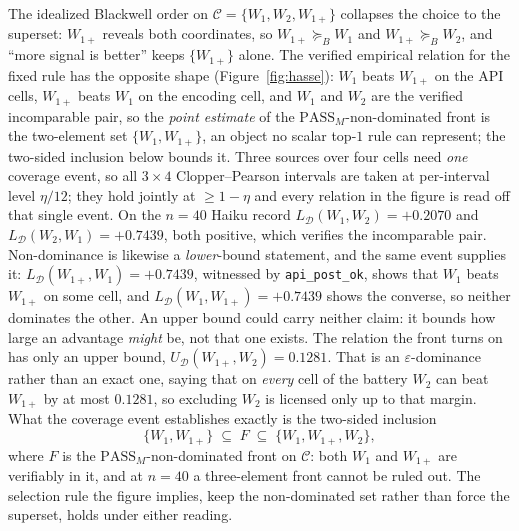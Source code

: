 \documentclass[11pt]{article}
\theoremstyle{plain}
\theoremstyle{definition}
\theoremstyle{remark}
\newcommand{\PASS}{\mathrm{PASS}}
\newcommand{\Dcal}{\mathcal{D}}
\newcommand{\Bord}{\succeq_{B}}
\begin{document}
The idealized Blackwell order on $\mathcal{C}=\{W_1,W_2,W_{1+}\}$ collapses the choice to the
superset: $W_{1+}$ reveals both coordinates, so $W_{1+}\Bord W_1$ and $W_{1+}\Bord W_2$, and
``more signal is better'' keeps $\{W_{1+}\}$ alone. The verified empirical relation for the fixed
rule has the opposite shape (Figure~\ref{fig:hasse}): $W_1$ beats $W_{1+}$ on the API cells,
$W_{1+}$ beats $W_1$ on the encoding cell, and $W_1$ and $W_2$ are the verified incomparable pair,
so the \emph{point estimate} of the $\PASS_M$-non-dominated front is the two-element set
$\{W_1, W_{1+}\}$, an object no scalar top-$1$ rule can represent; the two-sided
inclusion below bounds it. Three sources over four cells need
\emph{one} coverage event, so all
$3\times 4$ Clopper--Pearson intervals are taken at per-interval level $\eta/12$; they hold jointly
at $\ge 1-\eta$ and every relation in the figure is read off that single event. On the $n{=}40$
Haiku record $L_{\Dcal}(W_1,W_2)=+0.2070$ and $L_{\Dcal}(W_2,W_1)=+0.7439$, both positive,
which verifies the incomparable pair.
Non-dominance is likewise a \emph{lower}-bound statement, and the same event supplies it:
$L_{\Dcal}(W_{1+},W_1)=+0.7439$, witnessed by \texttt{api\_post\_ok}, shows that $W_1$ beats
$W_{1+}$ on some cell, and $L_{\Dcal}(W_1,W_{1+})=+0.7439$ shows the converse, so neither dominates
the other. An upper bound could carry neither claim: it bounds how large an advantage \emph{might}
be, not that one exists. The relation the front turns on has only an upper bound,
$U_{\Dcal}(W_{1+},W_2)=0.1281$. That is an $\varepsilon$-dominance rather than an exact one, saying
that on \emph{every} cell of the battery $W_2$ can beat $W_{1+}$ by at most $0.1281$, so excluding
$W_2$ is licensed only up to that margin. What the coverage event establishes exactly is the
two-sided inclusion
\[
  \{W_1, W_{1+}\} \;\subseteq\; F \;\subseteq\; \{W_1, W_{1+}, W_2\},
\]
where $F$ is the $\PASS_M$-non-dominated front on $\mathcal{C}$: both $W_1$ and $W_{1+}$ are
verifiably in it, and at $n=40$ a three-element front cannot be ruled out. The selection rule the
figure implies, keep the non-dominated set rather than force the superset, holds under either
reading.
\end{document}
